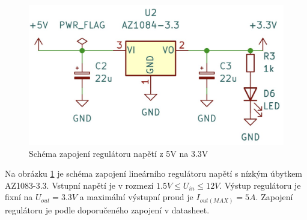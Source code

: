 \begin{figure}[H]
    \includegraphics[width=0.9\linewidth]{pictures/ldo_3v3.jpg}
    \caption{Schéma zapojení regulátoru napětí z 5V na 3.3V}
    \label{fig:stepdown}
\end{figure}
Na obrázku \ref{fig:stepdown} je schéma zapojení lineárního regulátoru napětí s nízkým úbytkem AZ1083-3.3. Vstupní napětí je v rozmezí $1.5V \leq U_{in} \leq 12V $. Výstup regulátoru je fixní na $U_{out} = 3.3V$ a maximální výstupní proud je $I_{out(MAX)} = 5A$. Zapojení regulátoru je podle doporučeného zapojení v datasheet.
